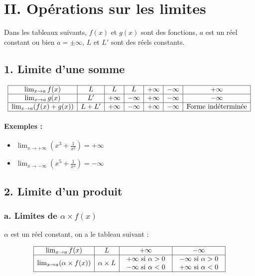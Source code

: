 \documentclass[12pt,a4paper]{article}
\begin{document}
\section*{\color{myred}II. Opérations sur les limites}

Dans les tableaux suivants, \( f(x) \) et \( g(x) \) sont des fonctions, \( a \) est un réel constant ou bien \( a = \pm\infty \), \( L \) et \( L' \) sont des réels constants.

\subsection*{\color{myred}1. Limite d'une somme}

\[
\begin{array}{|c|c|c|c|c|c|c|}
\hline
\lim_{x \to a} f(x) & L & L & L & +\infty & -\infty & +\infty \\
\hline
\lim_{x \to a} g(x) & L' & +\infty & -\infty & +\infty & -\infty & -\infty \\
\hline
\lim_{x \to a} (f(x) + g(x)) & L + L' & +\infty & -\infty & +\infty & -\infty & \text{Forme indéterminée} \\
\hline
\end{array}
\]

\paragraph{Exemples :}
\begin{itemize}
    \item  $\lim_{x \to +\infty} \left(x^3 + \frac{1}{x^2}\right) = +\infty$

    \item $    \lim_{x \to -\infty} \left(x^5 + \frac{1}{x^4}\right) = -\infty$

\end{itemize}

\subsection*{\color{myred}2. Limite d'un produit}

\subsubsection*{\color{myred}a. Limites de \( \alpha \times f(x) \)}

\( \alpha \) est un réel constant, on a le tableau suivant :

\[
\begin{array}{|c|c|c|c|}
\hline
\lim_{x \to a} f(x) & L & +\infty & -\infty \\
\hline
\lim_{x \to a} (\alpha \times f(x)) & \alpha \times L & 
\begin{array}{c}
+\infty \text{ si } \alpha > 0 \\
-\infty \text{ si } \alpha < 0
\end{array} & 
\begin{array}{c}
-\infty \text{ si } \alpha > 0 \\
+\infty \text{ si } \alpha < 0
\end{array} \\
\hline
\end{array}
\]
\end{document}
